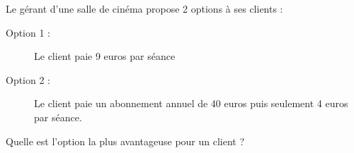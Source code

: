 
Le gérant d'une salle de cinéma propose 2 options à ses clients :
\begin{description}
\item[Option 1 : ] Le client paie 9 euros par séance
\item[Option 2 : ] Le client paie un abonnement annuel de 40 euros puis seulement 4 euros par séance.
\end{description}

Quelle est l'option la plus avantageuse pour un client ?